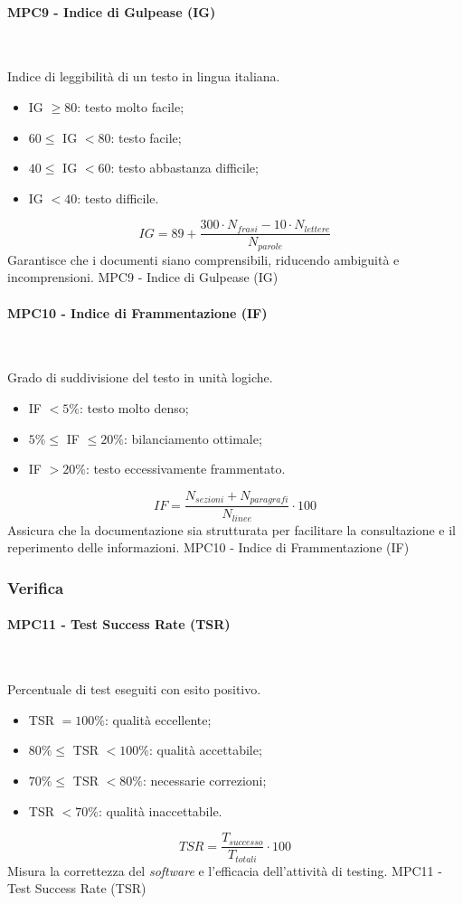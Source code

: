 \documentclass[10pt, letterpaper]{article}
\newcommand{\trisubsection}[1]{\paragraph{#1}\mbox{}\\}
\begin{document}
\trisubsection{MPC9 - Indice di Gulpease (IG)}
{Indice di leggibilità di un testo in lingua italiana.
    \begin{itemize}
        \item IG $\geq 80$: testo molto facile;
        \item $60 \leq$ IG $< 80$: testo facile;
        \item $40 \leq$ IG $< 60$: testo abbastanza difficile;
        \item IG $< 40$: testo difficile.
    \end{itemize}}
{\[ IG = 89 + \frac{300 \cdot N_{frasi} - 10 \cdot N_{lettere}}{N_{parole}} \]}
{Garantisce che i documenti siano comprensibili, riducendo ambiguità e incomprensioni.}
{MPC9 - Indice di Gulpease (IG)}

\trisubsection{MPC10 - Indice di Frammentazione (IF)}
{Grado di suddivisione del testo in unità logiche.
    \begin{itemize}
        \item IF $< 5\%$: testo molto denso;
        \item $5\% \le$ IF $\le 20\%$: bilanciamento ottimale;
        \item IF $> 20\%$: testo eccessivamente frammentato.
    \end{itemize}}
{\[ IF = \frac{N_{sezioni} + N_{paragrafi}}{N_{linee}} \cdot 100 \]}
{Assicura che la documentazione sia strutturata per facilitare la consultazione e il reperimento delle informazioni.}
{MPC10 - Indice di Frammentazione (IF)}

\subsubsection{Verifica}

\trisubsection{MPC11 - Test Success Rate (TSR)}
{Percentuale di test eseguiti con esito positivo.
    \begin{itemize}
        \item TSR $= 100\%$: qualità eccellente;
        \item $80\% \leq$ TSR $< 100\%$: qualità accettabile;
        \item $70\% \leq$ TSR $< 80\%$: necessarie correzioni;
        \item TSR $< 70\%$: qualità inaccettabile.
    \end{itemize}}
{\[ TSR = \frac{T_{successo}}{T_{totali}} \cdot 100 \]}
{Misura la correttezza del \textit{software} e l'efficacia dell'attività di testing.}
{MPC11 - Test Success Rate (TSR)}
\end{document}
